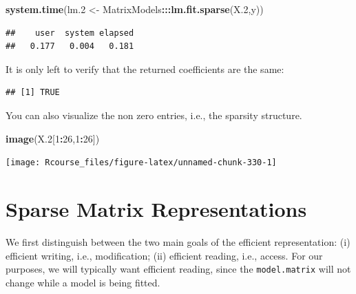 \documentclass[]{book}
\newenvironment{Shaded}{\begin{snugshade}}{\end{snugshade}}
\newcommand{\KeywordTok}[1]{\textcolor[rgb]{0.13,0.29,0.53}{\textbf{#1}}}
\newcommand{\DataTypeTok}[1]{\textcolor[rgb]{0.13,0.29,0.53}{#1}}
\newcommand{\DecValTok}[1]{\textcolor[rgb]{0.00,0.00,0.81}{#1}}
\newcommand{\FloatTok}[1]{\textcolor[rgb]{0.00,0.00,0.81}{#1}}
\newcommand{\StringTok}[1]{\textcolor[rgb]{0.31,0.60,0.02}{#1}}
\newcommand{\OperatorTok}[1]{\textcolor[rgb]{0.81,0.36,0.00}{\textbf{#1}}}
\newcommand{\NormalTok}[1]{#1}
\theoremstyle{definition}
\theoremstyle{definition}
\theoremstyle{definition}
\theoremstyle{remark}
\begin{document}
\begin{Shaded}
\begin{Highlighting}[]
\KeywordTok{system.time}\NormalTok{(lm.}\DecValTok{2}\NormalTok{ <-}\StringTok{ }\NormalTok{MatrixModels}\OperatorTok{:::}\KeywordTok{lm.fit.sparse}\NormalTok{(X.}\DecValTok{2}\NormalTok{,y))}
\end{Highlighting}
\end{Shaded}

\begin{verbatim}
##    user  system elapsed 
##   0.177   0.004   0.181
\end{verbatim}

It is only left to verify that the returned coefficients are the same:

\begin{Shaded}
\end{Shaded}

\begin{verbatim}
## [1] TRUE
\end{verbatim}

You can also visualize the non zero entries, i.e., the sparsity
structure.

\begin{Shaded}
\begin{Highlighting}[]
\KeywordTok{image}\NormalTok{(X.}\DecValTok{2}\NormalTok{[}\DecValTok{1}\OperatorTok{:}\DecValTok{26}\NormalTok{,}\DecValTok{1}\OperatorTok{:}\DecValTok{26}\NormalTok{])}
\end{Highlighting}
\end{Shaded}

\texttt{[image: Rcourse\_files/figure-latex/unnamed-chunk-330-1]}

\section{Sparse Matrix
Representations}\label{sparse-matrix-representations}

We first distinguish between the two main goals of the efficient
representation: (i) efficient writing, i.e., modification; (ii)
efficient reading, i.e., access. For our purposes, we will typically
want efficient reading, since the \texttt{model.matrix} will not change
while a model is being fitted.
\end{document}
